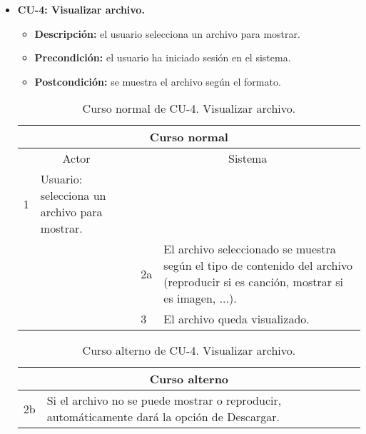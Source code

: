 \begin{itemize}
	\item \textbf{CU-4: Visualizar archivo.}
	\begin{itemize}
		\item \textbf{Descripción:} el usuario selecciona un archivo para mostrar.
		\item \textbf{Precondición:} el usuario ha iniciado sesión en el sistema.
		\item \textbf{Postcondición:} se muestra el archivo según el formato.
	\end{itemize}
	\begin{table}[H]
		\centering
		\begin{tabular}{|p{0.3cm}|p{5cm}|p{0.3cm}|p{5cm}|}
			\hline
			\multicolumn{4}{|c|}{Curso normal} \\ \hline
			\multicolumn{2}{|c|}{Actor} & \multicolumn{2}{|c|}{Sistema} \\ \hline
			1 & Usuario: selecciona un archivo para mostrar. &  &  \\ \hline
			&  & 2a & El archivo seleccionado se muestra según el tipo de contenido del archivo (reproducir si es canción, mostrar si es imagen, ...). \\ \hline
			&  & 3 & El archivo queda visualizado. \\ \hline
		\end{tabular}
		\caption{Curso normal de CU-4. Visualizar archivo.}
		\label{tabla:cu4-normal}
	\end{table}
	
	\begin{table}[H]
		\centering
		\begin{tabular}{|p{0.3cm}|p{10cm}|}
			\hline
			\multicolumn{2}{|c|}{Curso alterno} \\ \hline
			2b & Si el archivo no se puede mostrar o reproducir, automáticamente dará la opción de Descargar. \\ \hline
		\end{tabular}
		\caption{Curso alterno de CU-4. Visualizar archivo.}
		\label{tabla:cu4-alterno}
	\end{table}
\end{itemize}


\newpage

